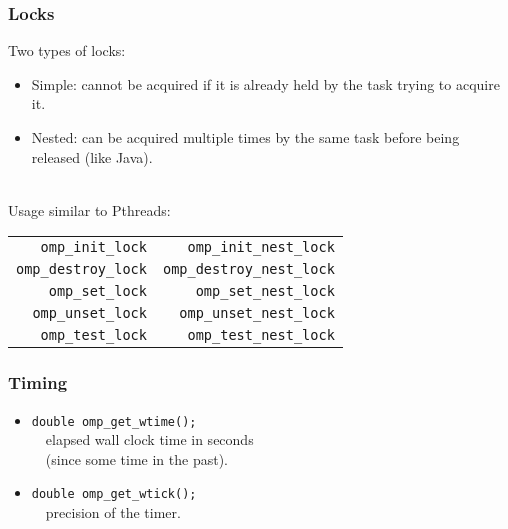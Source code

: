 \documentclass[aspectratio=43]{beamer}
\newenvironment{changemargin}[1]{%
  \begin{list}{}{%
    \setlength{\topsep}{0pt}%
    \setlength{\leftmargin}{#1}%
    \setlength{\rightmargin}{1em}
    \setlength{\listparindent}{\parindent}%
    \setlength{\itemindent}{\parindent}%
    \setlength{\parsep}{\parskip}%
  }%
  \item[]}{\end{list}}
\begin{document}
\begin{frame}
  \frametitle{Locks}

  \begin{changemargin}{2.5cm}

  Two types of locks:
  
  \begin{itemize}
    \item Simple: cannot be acquired if it is already held by the task trying to acquire it.
    \item Nested: can be acquired multiple times by the same task before being released (like Java).
  \end{itemize}

  ~\\
  Usage similar to Pthreads:

  \begin{center}
    \begin{tabular}{r | r}
      {\tt omp\_init\_lock} & {\tt omp\_init\_nest\_lock}\\
      {\tt omp\_destroy\_lock} & {\tt omp\_destroy\_nest\_lock}\\
      {\tt omp\_set\_lock} & {\tt omp\_set\_nest\_lock}\\
      {\tt omp\_unset\_lock} & {\tt omp\_unset\_nest\_lock}\\
      {\tt omp\_test\_lock} & {\tt omp\_test\_nest\_lock}\\
    \end{tabular}
  \end{center}
  \end{changemargin}


\end{frame}

\begin{frame}
  \frametitle{Timing}

  \begin{changemargin}{2.5cm}
  \begin{itemize}
    \item {\tt double omp\_get\_wtime();}\\
        ~~elapsed wall clock time in seconds\\ 
        ~~(since some time in the past).\\[1em]
    \item {\tt double omp\_get\_wtick();}\\
        ~~precision of the timer.
  \end{itemize}
  \end{changemargin}

\end{frame}
\end{document}
